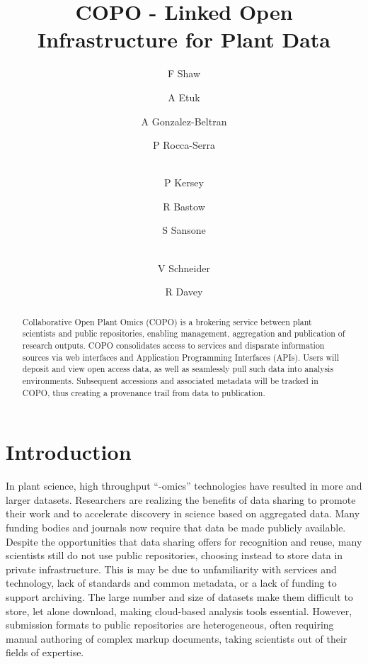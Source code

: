 \documentclass[runningheads,a4paper]{llncs}
\begin{document}
\title{COPO - Linked Open Infrastructure for Plant Data}

\author{F Shaw  \and A Etuk  \and A Gonzalez-Beltran
  \and P Rocca-Serra \and\\
  P  Kersey \and R Bastow  \and S Sansone \and\\
  V Schneider \and R Davey }
%


\maketitle

\vspace*{-0.2in}
\begin{abstract}
Collaborative Open Plant Omics (COPO) is a brokering service between plant scientists and public repositories, enabling management, aggregation and publication of research outputs. COPO consolidates access to services and disparate information sources via web interfaces and Application Programming Interfaces (APIs). Users will deposit and view open access data, as well as seamlessly pull such data into analysis environments. Subsequent accessions and associated metadata will be tracked in COPO, thus creating a provenance trail from data to publication.
\end{abstract}

\vspace*{-0.3in}
\section{Introduction}

In plant science, high throughput ``-omics'' technologies have resulted in more and larger datasets. Researchers are realizing the benefits of data sharing to promote their work and to accelerate discovery in science based on aggregated data. Many funding bodies and journals now require that data be made publicly available. Despite the opportunities that data sharing offers for recognition and reuse, many
scientists still do not use public repositories, choosing instead to store data in private infrastructure. This is may be due to unfamiliarity with services and technology, lack of standards and common metadata, or a lack of funding to support archiving. The large number and size of datasets make them difficult to
store, let alone download, making cloud-based analysis tools essential. However, submission formats to public repositories are heterogeneous, often requiring manual authoring of complex markup documents, taking scientists out of their fields of expertise.
\end{document}
